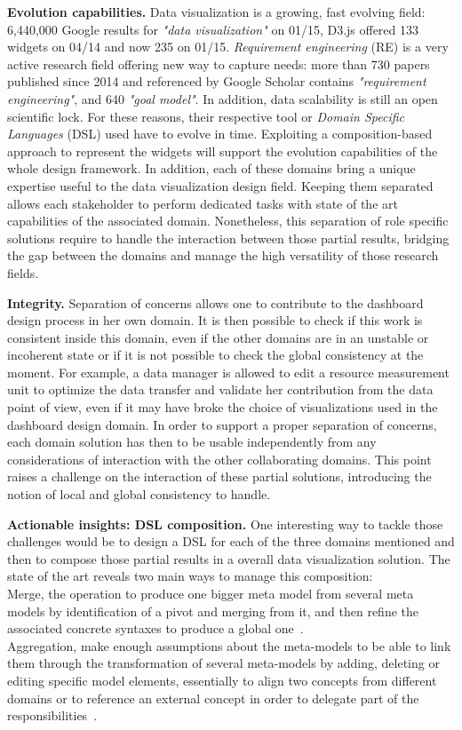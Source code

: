 \documentclass{acm_proc_article-sp}
\begin{document}
\textbf{Evolution capabilities.}  Data visualization is a growing,
fast evolving field: 6,440,000 Google results for \emph{"data
  visualization"} on 01/15, D3.js offered 133 widgets on 04/14 and now
235 on 01/15. \emph{Requirement engineering} (RE) is a very active
research field offering new way to capture needs: more than 730 papers
published since 2014 and referenced by Google Scholar contains
\emph{"requirement engineering"}, and 640 \emph{"goal model"}. In
addition, data scalability is still an open scientific lock. For these
reasons, their respective tool or \emph{Domain Specific Languages}
(DSL) used have to evolve in time.  Exploiting a composition-based
approach to represent the widgets will support the evolution
capabilities of the whole design framework. In addition, each of these
domains bring a unique expertise useful to the data visualization
design field. Keeping them separated allows each stakeholder to
perform dedicated tasks with state of the art capabilities of the
associated domain.  Nonetheless, this separation of role specific
solutions require to handle the interaction between those partial
results, bridging the gap between the domains and manage the high
versatility of those research fields.

\textbf{Integrity.} Separation of concerns allows one to contribute to
the dashboard design process in her own domain. It is then possible to
check if this work is consistent inside this domain, even if the other
domains are in an unstable or incoherent state or if it is not
possible to check the global consistency at the moment. For example, a
data manager is allowed to edit a resource measurement unit to
optimize the data transfer and validate her contribution from the data
point of view, even if it may have broke the choice of visualizations
used in the dashboard design domain.  In order to support a proper
separation of concerns, each domain solution has then to be usable
independently from any considerations of interaction with the other
collaborating domains.  This point raises a challenge on the
interaction of these partial solutions, introducing the notion of
local and global consistency to handle.

\textbf{Actionable insights: DSL composition.}  One interesting way to
tackle those challenges would be to design a DSL for each of the three
domains mentioned and then to compose those partial results in a
overall data visualization solution.
The state of the art reveals two main ways to manage this composition:\\
 Merge, \ie the operation to produce one bigger meta model
from several meta models by identification of a pivot and merging from
it, and then refine the associated concrete syntaxes to produce a global 
one~\cite{kienzle13}.\\
 Aggregation, \ie make enough assumptions about the
meta-models to be able to link them through the transformation of
several meta-models by adding, deleting or editing specific model
elements, essentially to align two concepts from different domains or
to reference an external concept
in order to delegate part of the responsibilities~\cite{blouin14}.
\end{document}
